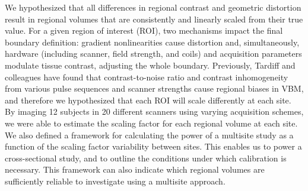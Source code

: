 We hypothesized that all differences in regional contrast and geometric distortion result in regional volumes that are consistently and linearly scaled from their true value. For a given region of interest (ROI), two mechanisms impact the final boundary definition: gradient nonlinearities cause distortion and, simultaneously, hardware  (including scanner, field strength, and coils) and acquisition parameters modulate tissue contrast, adjusting the whole boundary. Previously, Tardiff and colleagues have found that contrast-to-noise ratio and contrast inhomogeneity from various pulse sequences and scanner strengths cause regional biases in VBM\cite{tardif2010regional, tardif2009sensitivity}, and therefore we hypothesized that each ROI will scale differently at each site. By imaging 12 subjects in 20 different scanners using varying acquisition schemes, we were able to estimate the scaling factor for each regional volume at each site. We also defined a framework for calculating the power of a multisite study as a function of the scaling factor variability between sites. This enables us to power a cross-sectional study, and to outline the conditions under which calibration is necessary. This framework can also indicate which regional volumes are sufficiently reliable to investigate using a multisite approach.